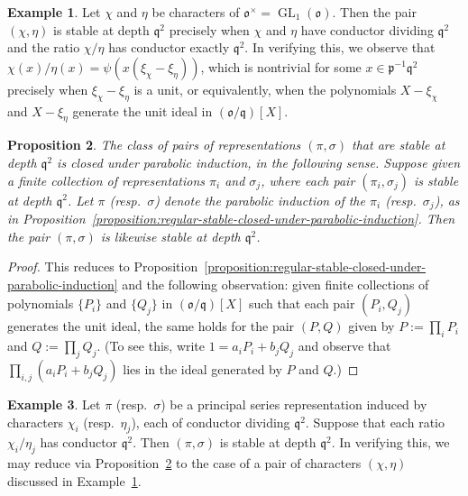 \documentclass[reqno]{amsart}
\DeclareMathOperator{\GL}{GL}
\theoremstyle{plain} \newtheorem{theorem} {Theorem} \newtheorem{conjecture} {Conjecture} \newtheorem{corollary} [theorem] {Corollary} \newtheorem{proposition} [theorem] {Proposition} \newtheorem{fact} [theorem] {Fact}
\theoremstyle{definition} \newtheorem{definition} [theorem] {Definition}
\newtheorem{example} [theorem] {Example} \newtheorem{assertion}
\theoremstyle{itplain} %
\newcommand{\mfq}{\mathfrak{q}}
\begin{document}
\begin{example}\label{example:stable-pairs-of-characters}
  Let $\chi$ and $\eta$ be characters of $\mathfrak{o}^\times = \GL_1(\mathfrak{o})$. Then the pair $(\chi,\eta)$ is stable at depth $\mfq^2$ precisely when $\chi$ and $\eta$ have conductor dividing $\mfq^2$ and the ratio $\chi/\eta$ has conductor exactly $\mfq^2$.  In verifying this, we observe that $\chi(x) / \eta (x) = \psi (x (\xi_\chi - \xi_\eta ))$, which is nontrivial for some $x \in \mathfrak{p}^{-1} \mfq^2$ precisely when $\xi_\chi - \xi_\eta$ is a unit, or equivalently, when the polynomials $X - \xi_\chi$ and $X - \xi_\eta$ generate the unit ideal in $(\mathfrak{o} / \mfq )[X]$.
\end{example}


\begin{proposition}\label{proposition:stable-pairs-closed-under-parabolic-induction}
  The class of pairs of representations $(\pi,\sigma)$ that are stable at depth $\mfq^2$ is closed under parabolic induction, in the following sense.  Suppose given a finite collection of representations $\pi_i$ and $\sigma_j$, where each pair $(\pi_i,\sigma_j)$ is stable at depth $\mfq^2$.  Let $\pi$ (resp.\ $\sigma$) denote the parabolic induction of the $\pi_i$ (resp.\ $\sigma_j$), as in Proposition~\ref{proposition:regular-stable-closed-under-parabolic-induction}.  Then the pair $(\pi,\sigma)$ is likewise stable at depth $\mfq^2$.
\end{proposition}
\begin{proof}
  This reduces to Proposition~\ref{proposition:regular-stable-closed-under-parabolic-induction} and the following observation: given finite collections of polynomials $\{P_i\}$ and $\{Q_j\}$ in $(\mathfrak{o} / \mfq )[X]$ such that each pair $(P_i,Q_j)$ generates the unit ideal, the same holds for the pair $(P,Q)$ given by $P := \prod_i P_i$ and $Q := \prod_j Q_j$.  (To see this, write $1 = a_i P_i + b_j Q_j$ and observe that $\prod_{i,j} (a_i P_i + b_j Q_j)$ lies in the ideal generated by $P$ and $Q$.)
\end{proof}

\begin{example}
  Let $\pi$ (resp.\ $\sigma$) be a principal series representation induced by characters $\chi_i$ (resp.\ $\eta_j$), each of conductor dividing $\mfq^2$.  Suppose that each ratio $\chi_i / \eta_j$ has conductor $\mfq^2$.  Then $(\pi,\sigma)$ is stable at depth $\mfq^2$.  In verifying this, we may reduce via Proposition~\ref{proposition:stable-pairs-closed-under-parabolic-induction} to the case of a pair of characters $(\chi,\eta)$ discussed in Example~\ref{example:stable-pairs-of-characters}.
\end{example}
\end{document}
